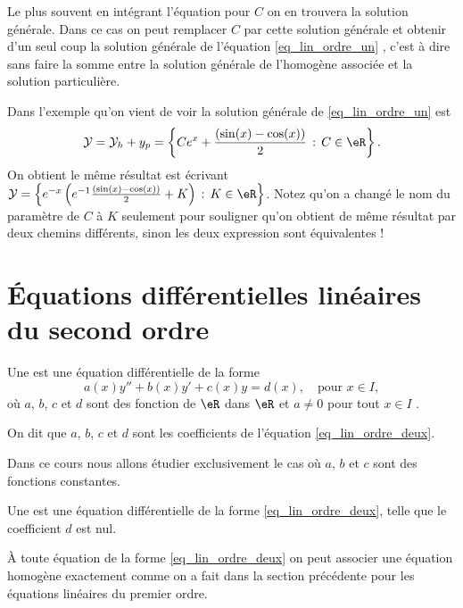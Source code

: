 \begin{remark}
  Le plus souvent en intégrant l'équation pour $C$ on en trouvera la solution générale. Dans ce cas on peut remplacer $C$ par cette solution générale et obtenir d'un seul coup la solution générale de l'équation \eqref{eq_lin_ordre_un} , c'est à dire sans faire la somme entre la solution générale de l'homogène associée et la solution particulière.  

  \begin{example}
    Dans l'exemple qu'on vient de voir la solution générale de \eqref{eq_lin_ordre_un} est 
    \begin{equation}
      \mathcal{Y} = \mathcal{Y}_h + y_p = \left\{Ce^x + \frac{(\sin(x)-\cos(x))}{2} \,:\, C\in\eR\right\}. 
    \end{equation}
On obtient le m\^eme résultat est écrivant $\mathcal{Y} = \left\{e^{-x}\left(e^{-1}\frac{(\sin(x)-\cos(x))}{2} +K \right) \,:\, K\in\eR\right\}$. Notez qu'on a changé le nom du paramètre de $C$ à $K$ seulement pour souligner qu'on obtient de m\^eme résultat par deux chemins différents, sinon les deux expression sont équivalentes !
  \end{example}
\end{remark}

\section{Équations différentielles linéaires du second ordre}
\label{Secordredeux}

\begin{definition}
Une   est une équation différentielle de la forme 
\begin{equation}\label{eq_lin_ordre_deux}
  a(x)y'' + b(x) y' + c(x)y = d(x), \quad\text{pour } x\in I, 
\end{equation}
o\`u $a$, $b$, $c$ et $d$ sont des fonction de $\eR$ dans $\eR$ et $a\neq 0$ pour tout $x\in I$ . 

On dit que $a$, $b$, $c$ et $d$ sont les coefficients de l'équation \eqref{eq_lin_ordre_deux}.
\end{definition}
Dans ce cours nous allons étudier exclusivement le cas où $a$, $b$ et $c$ sont des fonctions constantes. 
\begin{definition}
Une   est une équation différentielle de la forme \eqref{eq_lin_ordre_deux}, telle que le coefficient $d$ est nul.
\end{definition}
À toute équation de la forme \eqref{eq_lin_ordre_deux} on peut associer une équation homogène exactement comme on a fait dans la section précédente pour les équations linéaires du premier ordre.
